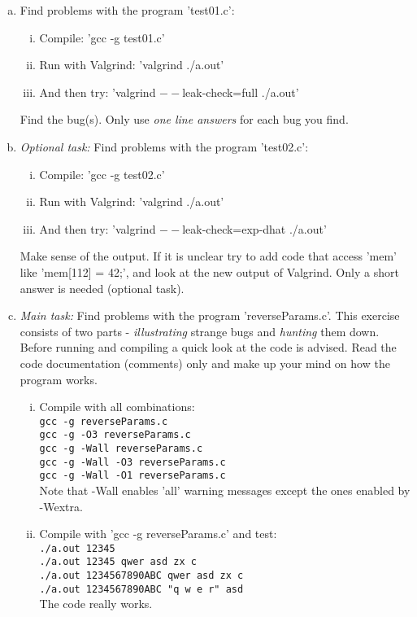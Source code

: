 \documentclass[10pt,a4paper]{article}
\begin{document}
\begin{enumerate}[a)]
	\item Find problems with the program 'test01.c':
	\begin{enumerate}[i)]
		\item Compile: 'gcc -g test01.c'
		\item Run with Valgrind: 'valgrind ./a.out'
		\item And then try: 'valgrind $--$leak-check=full ./a.out'
	\end{enumerate}
	Find the bug(s). Only use \emph{one line answers} for each bug you find. 
	\item \emph {Optional task:} Find problems with the program 'test02.c':
	\begin{enumerate}[i)]
		\item Compile: 'gcc -g test02.c'
		\item Run with Valgrind: 'valgrind ./a.out'
		\item And then try: 'valgrind $--$leak-check=exp-dhat ./a.out'
	\end{enumerate}
	Make sense of the output. If it is unclear try to add code that access 'mem' like 'mem[112] = 42;', and look at the new output of Valgrind. Only a short answer is needed (optional task). 
	\item \emph {Main task:} Find problems with the program 'reverseParams.c'. This exercise consists of two parts - \emph {illustrating} strange bugs and \emph{hunting} them down. Before running and compiling a quick look at the code is advised. Read the code documentation (comments) only and make up your mind on how the program works.
	
	
	\begin{enumerate}[i)]
		\item Compile with all combinations:\\
{\tt {gcc -g reverseParams.c \\
gcc -g -O3 reverseParams.c \\
gcc -g -Wall reverseParams.c\\
gcc -g -Wall -O3 reverseParams.c\\
gcc -g -Wall -O1 reverseParams.c}}\\
Note that -Wall enables 'all' warning messages except the ones enabled by -Wextra.
		\item Compile with 'gcc -g reverseParams.c' and test:\\
{\tt {./a.out 12345\\
./a.out 12345 qwer asd zx c\\
./a.out 1234567890ABC qwer asd zx c\\
./a.out 1234567890ABC "q w e r" asd\\}}
The code really works.


\end{enumerate}
\end{enumerate}
\end{document}
